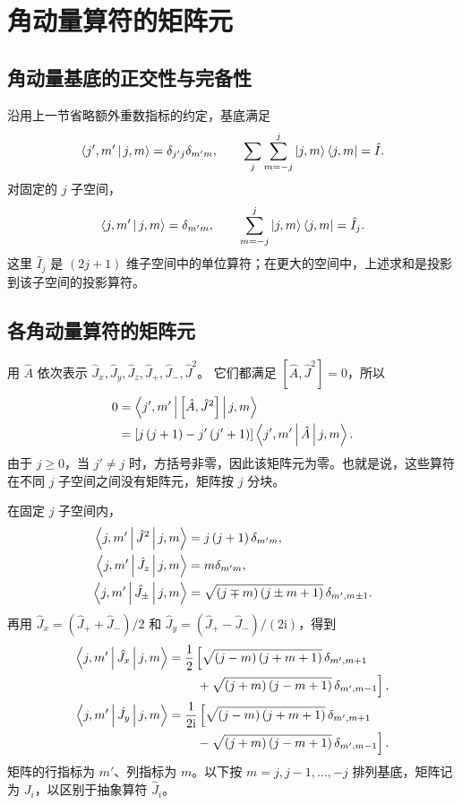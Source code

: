 \section{角动量算符的矩阵元}
\subsection{角动量基底的正交性与完备性}
沿用上一节省略额外重数指标的约定，基底满足
\begin{equation}
\Braket{j',m'|j,m}=\delta_{j'j}\delta_{m'm},\qquad
\sum_j\sum_{m=-j}^j\Ket{j,m}\Bra{j,m}=\hat I.
\end{equation}
对固定的 $j$ 子空间，
\begin{equation}
\Braket{j,m'|j,m}=\delta_{m'm},\qquad
\sum_{m=-j}^j\Ket{j,m}\Bra{j,m}=\hat I_j.
\end{equation}
这里 $\hat I_j$ 是 $\left(2j+1\right)$ 维子空间中的单位算符；在更大的空间中，上述求和是投影到该子空间的投影算符。

\subsection{各角动量算符的矩阵元}
用 $\hat A$ 依次表示 $\hat J_x,\hat J_y,\hat J_z,\hat J_+,\hat J_-,\hat J^2$。
它们都满足 $\left[\hat A,\hat J^2\right]=0$，所以
\begin{align}
0&=\Braket{j',m'|\left[\hat A,\hat J^2\right]|j,m}\notag\\
&=\left[j\left(j+1\right)-j'\left(j'+1\right)\right]
\Braket{j',m'|\hat A|j,m}.
\end{align}
由于 $j\geq0$，当 $j'\neq j$ 时，方括号非零，因此该矩阵元为零。也就是说，这些算符在不同 $j$ 子空间之间没有矩阵元，矩阵按 $j$ 分块。

在固定 $j$ 子空间内，
\begin{align}
\Braket{j,m'|\hat J^2|j,m}&=j\left(j+1\right)\delta_{m'm},\\
\Braket{j,m'|\hat J_z|j,m}&=m\delta_{m'm},\\
\Braket{j,m'|\hat J_\pm|j,m}
&=\sqrt{\left(j\mp m\right)\left(j\pm m+1\right)}\,\delta_{m',m\pm1}.
\end{align}
再用 $\hat J_x=\left(\hat J_++\hat J_-\right)/2$ 和
$\hat J_y=\left(\hat J_+-\hat J_-\right)/\left(2\mathrm{i}\right)$，得到
\begin{align}
\Braket{j,m'|\hat J_x|j,m}
&=\frac12\left[\sqrt{\left(j-m\right)\left(j+m+1\right)}\,\delta_{m',m+1}\right.\notag\\
&\qquad\left.{}+\sqrt{\left(j+m\right)\left(j-m+1\right)}\,\delta_{m',m-1}\right],\\
\Braket{j,m'|\hat J_y|j,m}
&=\frac1{2\mathrm{i}}\left[\sqrt{\left(j-m\right)\left(j+m+1\right)}\,\delta_{m',m+1}\right.\notag\\
&\qquad\left.{}-\sqrt{\left(j+m\right)\left(j-m+1\right)}\,\delta_{m',m-1}\right].
\end{align}
矩阵的行指标为 $m'$、列指标为 $m$。以下按 $m=j,j-1,\ldots,-j$ 排列基底，矩阵记为 $J_i$，以区别于抽象算符 $\hat J_i$。

